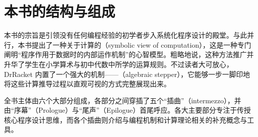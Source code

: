 \section*{本书的结构与组成}
\label{sec:preface:structure}

本书的宗旨是引领没有任何编程经验的初学者步入系统化程序设计的殿堂。与此并行，本书提出了一种关于计算的（symbolic view of computation），这是一种专门阐明“程序作用于数据时的内部运作机制”的心智模型。粗略地说，这种方法推广并升华了学生在小学算术与初中代数中所学的运算规则。不过读者大可放心，DrRacket 内置了一个强大的机制——（algebraic stepper），它能够一步一脚印地将这些计算推导过程以直观可视的方式完整展现出来。

全书主体由六个大部分组成，各部分之间穿插了五个“插曲”（intermezzo），并由“序幕”（Prologue）与“尾声”（Epilogue）首尾呼应。各大主要部分专注于传授核心程序设计思维，而各个插曲则介绍与编程机制和计算理论相关的补充概念与工具。

